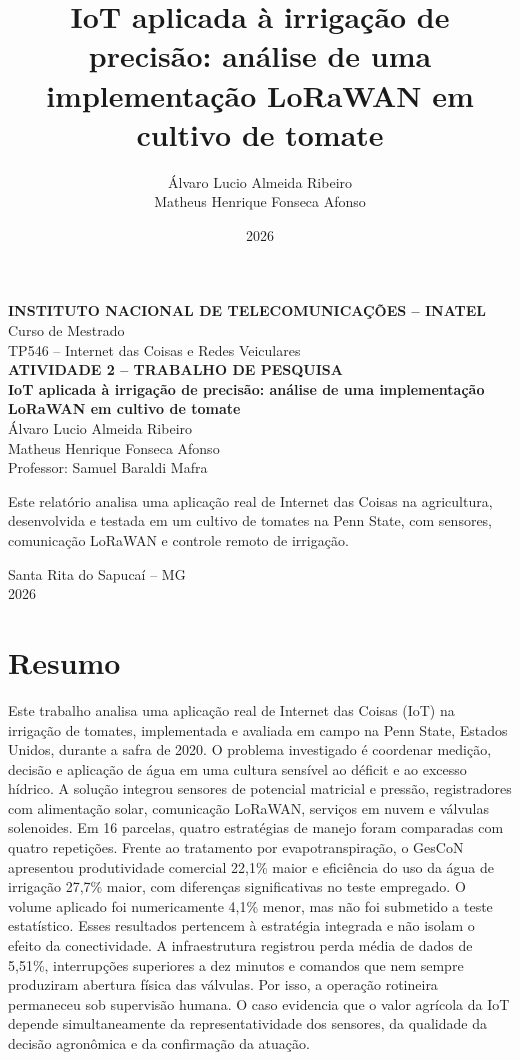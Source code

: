 \documentclass[11pt,a4paper]{article}
\title{\textbf{IoT aplicada à irrigação de precisão: análise de uma implementação LoRaWAN em cultivo de tomate}}
\author{Álvaro Lucio Almeida Ribeiro\\Matheus Henrique Fonseca Afonso}
\date{2026}
\begin{document}
\hypersetup{pageanchor=false}
\begin{titlepage}
\centering
\vspace*{1cm}
{\large \textbf{INSTITUTO NACIONAL DE TELECOMUNICAÇÕES -- INATEL}}\\[0.4cm]
{\large Curso de Mestrado}\\[0.4cm]
{\large TP546 -- Internet das Coisas e Redes Veiculares}\\[1.6cm]
{\large \textbf{ATIVIDADE 2 -- TRABALHO DE PESQUISA}}\\[1.4cm]
{\LARGE \textbf{IoT aplicada à irrigação de precisão: análise de uma implementação LoRaWAN em cultivo de tomate}}\\[1.5cm]
{\large Álvaro Lucio Almeida Ribeiro\\[0.2cm]Matheus Henrique Fonseca Afonso}\\[0.8cm]
{\large Professor: Samuel Baraldi Mafra}
\vfill
\begin{minipage}{0.82\textwidth}
\centering
Este relatório analisa uma aplicação real de Internet das Coisas na agricultura, desenvolvida e testada em um cultivo de tomates na Penn State, com sensores, comunicação LoRaWAN e controle remoto de irrigação.
\end{minipage}
\vfill
{\large Santa Rita do Sapucaí -- MG\\2026}
\end{titlepage}

\hypersetup{pageanchor=true}
\twocolumn
\section*{Resumo}
Este trabalho analisa uma aplicação real de Internet das Coisas (IoT) na irrigação de tomates, implementada e avaliada em campo na Penn State, Estados Unidos, durante a safra de 2020. O problema investigado é coordenar medição, decisão e aplicação de água em uma cultura sensível ao déficit e ao excesso hídrico. A solução integrou sensores de potencial matricial e pressão, registradores com alimentação solar, comunicação LoRaWAN, serviços em nuvem e válvulas solenoides. Em 16 parcelas, quatro estratégias de manejo foram comparadas com quatro repetições. Frente ao tratamento por evapotranspiração, o GesCoN apresentou produtividade comercial 22,1\% maior e eficiência do uso da água de irrigação 27,7\% maior, com diferenças significativas no teste empregado. O volume aplicado foi numericamente 4,1\% menor, mas não foi submetido a teste estatístico. Esses resultados pertencem à estratégia integrada e não isolam o efeito da conectividade. A infraestrutura registrou perda média de dados de 5,51\%, interrupções superiores a dez minutos e comandos que nem sempre produziram abertura física das válvulas. Por isso, a operação rotineira permaneceu sob supervisão humana. O caso evidencia que o valor agrícola da IoT depende simultaneamente da representatividade dos sensores, da qualidade da decisão agronômica e da confirmação da atuação.
\end{document}
